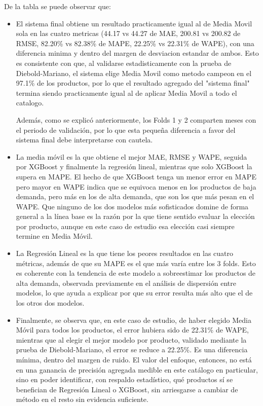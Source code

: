 De la tabla se puede observar que:

\begin{itemize}
    \item El sistema final obtiene un resultado practicamente igual al de Media Movil sola en las cuatro metricas (44.17 vs 44.27 de MAE, 200.81 vs 200.82 de RMSE, 82.20\% vs 82.38\% de MAPE, 22.25\% vs 22.31\% de WAPE), con una diferencia minima y dentro del margen de desviacion estandar de ambos. Esto es consistente con que, al validarse estadisticamente con la prueba de Diebold-Mariano, el sistema elige Media Movil como metodo campeon en el 97.1\% de los productos, por lo que el resultado agregado del "sistema final" termina siendo practicamente igual al de aplicar Media Movil a todo el catalogo.
    
    Además, como se explicó anteriormente, los Folds 1 y 2 comparten meses con el periodo de validación, por lo que esta pequeña diferencia a favor del sistema final debe interpretarse con cautela.
    
    \item La media móvil es la que obtiene el mejor MAE, RMSE y WAPE, seguida por XGBoost y finalmente la regresión lineal, mientras que solo XGBoost la supera en MAPE. El hecho de que XGBoost tenga un menor error en MAPE pero mayor en WAPE indica que se equivoca menos en los productos de baja demanda, pero más en los de alta demanda, que son los que más pesan en el WAPE. Que ninguno de los dos modelos más sofisticados domine de forma general a la línea base es la razón por la que tiene sentido evaluar la elección por producto, aunque en este caso de estudio esa elección casi siempre termine en Media Móvil.

    \item La Regresión Lineal es la que tiene los peores resultados en las cuatro métricas, además de que su MAPE es el que más varía entre los 3 folds. Esto es coherente con la tendencia de este modelo a sobreestimar los productos de alta demanda, observada previamente en el análisis de dispersión entre modelos, lo que ayuda a explicar por que su error resulta más alto que el de los otros dos modelos.
    \item Finalmente, se observa que, en este caso de estudio, de haber elegido Media Móvil para todos los productos, el error hubiera sido de 22.31\% de WAPE, mientras que al elegir el mejor modelo por producto, validado mediante la prueba de Diebold-Mariano, el error se reduce a 22.25\%. Es una diferencia mínima, dentro del margen de ruido. El valor del enfoque, entonces, no está en una ganancia de precisión agregada medible en este catálogo en particular, sino en poder identificar, con respaldo estadístico, qué productos sí se benefician de Regresión Lineal o XGBoost, sin arriesgarse a cambiar de método en el resto sin evidencia suficiente.
\end{itemize}

